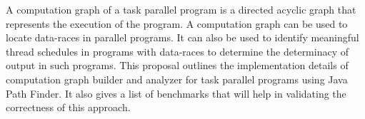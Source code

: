A computation graph of a task parallel program is a directed acyclic graph that represents the execution of the program. A computation graph can be used to locate data-races in parallel programs. It can also be used to identify meaningful thread schedules in programs with data-races to determine the determinacy of output in such programs. This proposal outlines the implementation details of computation graph builder and analyzer for task parallel programs using Java Path Finder. It also gives a list of benchmarks that will help in validating the correctness of this approach.